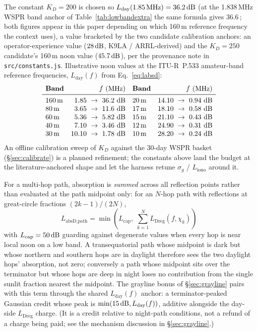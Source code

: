 \documentclass[11pt,a4paper]{article}
\newcommand{\SI}[2]{#1\,\text{#2}}
\newcommand{\si}[1]{\text{#1}}
\newcommand{\dB}{\text{dB}}
\newcommand{\MHz}{\text{MHz}}
\begin{document}
The constant $K_D = 200$ is chosen so $L_{\text{day}}(\SI{1.85}{\MHz}) =
\SI{36.2}{\dB}$ (at the 1.838\,MHz WSPR band anchor of
Table~\ref{tab:lowbandextra} the same formula gives
\SI{36.6}{\dB}; both figures appear in this paper depending on
which 160\,m reference frequency the context uses), a value
bracketed by the two candidate calibration anchors: an
operator-experience value
($\SI{28}{\dB}$, K9LA / ARRL-derived) and the $K_D = 250$
candidate's 160\,m noon value ($\SI{45.7}{\dB}$), per the
provenance note in
\texttt{src/constants.js}.
Illustrative noon values at the ITU-R~P.533 amateur-band reference
frequencies, $L_{\text{day}}(f)$ from Eq.~\ref{eq:labsd}:
\begin{equation*}
\begin{array}{lrlr}
\textbf{Band} & {f}~(\si{\MHz}) &
\textbf{Band} & {f}~(\si{\MHz})\\
\midrule
160\,\text{m} & 1.85~\to~36.2~\si{\dB} & 20\,\text{m} & 14.10~\to~0.94~\si{\dB} \\
80\,\text{m}  & 3.65~\to~11.6~\si{\dB} & 17\,\text{m} & 18.10~\to~0.58~\si{\dB} \\
60\,\text{m}  & 5.36~\to~5.82~\si{\dB} & 15\,\text{m} & 21.10~\to~0.43~\si{\dB} \\
40\,\text{m}  & 7.10~\to~3.46~\si{\dB} & 12\,\text{m} & 24.90~\to~0.31~\si{\dB} \\
30\,\text{m}  & 10.10~\to~1.78~\si{\dB} & 10\,\text{m} & 28.20~\to~0.24~\si{\dB} \\
\end{array}
\end{equation*}
\noindent
An offline calibration sweep of $K_D$ against the
30-day WSPR basket (\S\ref{sec:calibrate}) is a
planned refinement; the constants above land the budget at the
literature-anchored shape and let the harness retune
$\sigma_g$ / $L_{\text{iono}}$ around it.

For a multi-hop path, absorption is \emph{summed} across all
reflection points rather than evaluated at the path midpoint only:
for an $N$-hop path with reflections at great-circle fractions
$(2k-1)/(2N)$,
\begin{equation}\label{eq:labsd-path}
  L_{\text{absD},\text{path}} = \min\!\left(
    L_{\text{cap}},\;
    \sum_{k=1}^{N} L_{\text{Dreg}}(f, \chi_k)\right)
\end{equation}
with $L_{\text{cap}} = \SI{50}{\dB}$ guarding against degenerate
values when every hop is near local noon on a low band.  A
transequatorial path whose midpoint is dark but whose northern and
southern hops are in daylight therefore sees the two daylight hops'
absorption, not zero; conversely a path whose midpoint sits over
the terminator but whose hops are deep in night loses no
contribution from the single sunlit fraction nearest the midpoint.
The grayline bonus of \S\ref{sec:grayline} pairs with this term
through the shared $L_{\text{day}}(f)$ anchor: a
terminator-peaked Gaussian credit whose peak is
$\min(\SI{15}{\dB}, L_{\text{day}}(f))$, additive alongside the
day-side $L_{\text{Dreg}}$ charge.  (It is a credit relative to
night-path conditions, not a refund of a charge being paid;
see the mechanism discussion in \S\ref{sec:grayline}.)
\end{document}
